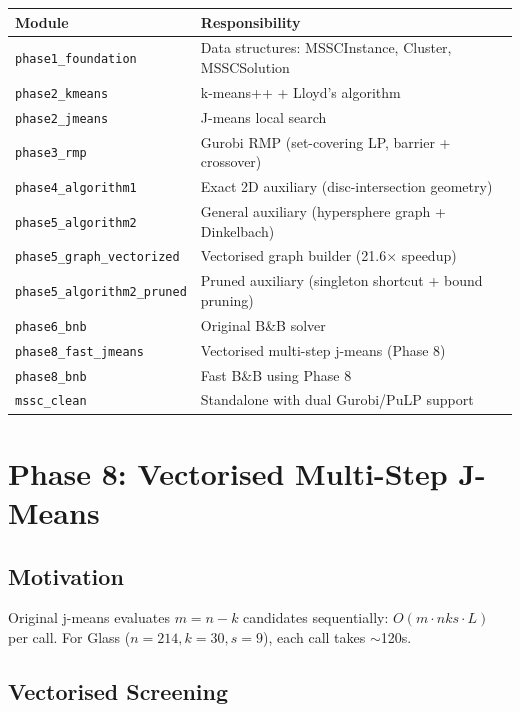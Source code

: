 \documentclass[12pt,a4paper]{article}
\begin{document}
\begin{center}
\small
\begin{tabular}{ll}
\toprule
Module & Responsibility \\
\midrule
\texttt{phase1\_foundation} & Data structures: MSSCInstance, Cluster, MSSCSolution \\
\texttt{phase2\_kmeans} & k-means++ + Lloyd's algorithm \\
\texttt{phase2\_jmeans} & J-means local search \\
\texttt{phase3\_rmp} & Gurobi RMP (set-covering LP, barrier + crossover) \\
\texttt{phase4\_algorithm1} & Exact 2D auxiliary (disc-intersection geometry) \\
\texttt{phase5\_algorithm2} & General auxiliary (hypersphere graph + Dinkelbach) \\
\texttt{phase5\_graph\_vectorized} & Vectorised graph builder (21.6$\times$ speedup) \\
\texttt{phase5\_algorithm2\_pruned} & Pruned auxiliary (singleton shortcut + bound pruning) \\
\texttt{phase6\_bnb} & Original B\&B solver \\
\texttt{phase8\_fast\_jmeans} & Vectorised multi-step j-means (Phase 8) \\
\texttt{phase8\_bnb} & Fast B\&B using Phase 8 \\
\texttt{mssc\_clean} & Standalone with dual Gurobi/PuLP support \\
\bottomrule
\end{tabular}
\end{center}

\section{Phase 8: Vectorised Multi-Step J-Means}
\label{sec:phase8}

\subsection{Motivation}

Original j-means evaluates $m = n-k$ candidates sequentially: $O(m \cdot nks \cdot L)$ per call. For Glass ($n=214, k=30, s=9$), each call takes $\sim$120s.

\subsection{Vectorised Screening}
\end{document}
